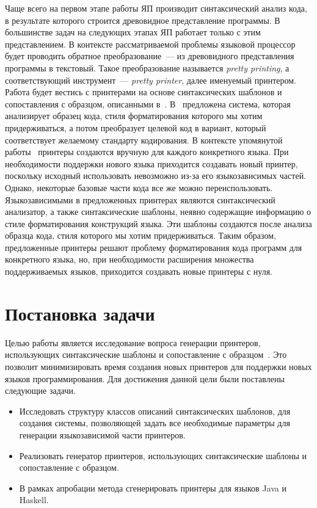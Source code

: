 Чаще всего на первом этапе работы ЯП производит синтаксический анализ кода, в результате которого строится древовидное представление программы. В большинстве задач на следующих этапах ЯП работает только с этим представлением. В контексте рассматриваемой проблемы языковой процессор будет проводить обратное преобразование~--- из древовидного представления программы в текстовый. Такое преобразование называется \textit{pretty printing}, а соответствующий инструмент~--- \textit{pretty printer}, далее именуемый принтером. Работа будет вестись с принтерами на основе синтаксических шаблонов и сопоставления с образцом, описанными в~\cite{podkopaev:course, podkopaev:diploma}. В~\cite{podkopaev:diploma} предложена система, которая анализирует образец кода, стиля форматирования которого мы хотим придерживаться, а потом преобразует целевой код в вариант, который соответствует желаемому стандарту кодирования. В контексте упомянутой работы~\cite{podkopaev:diploma} принтеры создаются вручную для каждого конкретного языка. При необходимости поддержки нового языка приходится создавать новый принтер, поскольку исходный использовать невозможно из-за его языкозависимых частей. Однако, некоторые базовые части кода все же можно переиспользовать. Языкозависимыми в предложенных принтерах являются синтаксический анализатор, а также синтаксические шаблоны, неявно содержащие информацию о стиле форматирования конструкций языка. Эти шаблоны создаются после анализа образца кода, стиля которого мы хотим придерживаться. Таким образом, предложенные принтеры решают проблему форматирования кода программ для конкретного языка, но, при необходимости расширения множества поддерживаемых языков, приходится создавать новые принтеры с нуля.

\section{Постановка задачи}

Целью работы является исследование вопроса генерации принтеров, использующих синтаксические шаблоны и сопоставление с образцом~\cite{podkopaev:diploma}. 
Это позволит минимизировать время создания новых принтеров для поддержки новых языков программирования.
Для достижения данной цели были поставлены следующие задачи.
\begin{itemize}
\item Исследовать структуру классов описаний синтаксических шаблонов, для создания системы, позволяющей задать все необходимые параметры для генерации языкозависимой части принтеров.
\item Реализовать генератор принтеров, использующих синтаксические шаблоны и сопоставление с образцом.
\item В рамках апробации метода сгенерировать принтеры для языков Java и Haskell.
\end{itemize}

